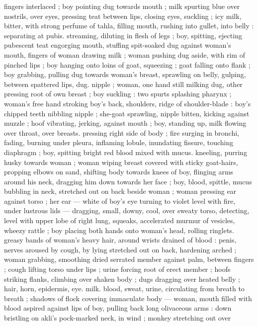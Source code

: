 fingers interlaced ; boy pointing dug towards mouth ; milk spurting 
blue over nostrils, over eyes, pressing teat between lips, closing 
eyes, suckling ; icy milk, bitter, with strong perfume of tahla, filling 
mouth, rushing into gullet, into belly : separating at pubis. 
streaming, diluting in flesh of legs ; boy, spitting, ejecting pubescent 
teat engorging mouth, stuffing spit-soaked dug against woman's 
mouth, fingers of woman drawing milk ; woman pushing dug aside, 
with rim of pinched lips ; boy hanging onto loins of goat, squeezing 
; goat falling onto flank ; boy grabbing, pulling dug towards woman's 
breast, sprawling on belly, gulping, between spattered lips, dug. 
nipple ; woman, one hand still milking dug, other pressing root of 
own breast ; boy suckling : two spurts splashing pharynx ; woman's 
free hand stroking boy's back, shoulders, ridge of shoulder-blade : 
boy's chipped teeth nibbling nipple ; she-goat sprawling, nipple 
bitten, kicking against muzzle ; hoof vibrating, jerking, against 
mouth ; boy, standing up, milk flowing over throat, over breasts. 
pressing right side of body ; fire surging in bronchi, fading, burning 
under pleura, inflaming lobule, inundating fissure, touching 
diaphragm ; boy, spitting bright red blood mixed with mucus. 
kneeling, purring husky towards woman ; woman wiping breast 
covered with sticky goat-hairs, propping elbows on sand, shifting 
body towards knees of boy, flinging arms around his neck, dragging 
him down towards her face ; boy, blood, spittle, mucus bubbling in 
neck, stretched out on back beside woman ; woman pressing ear 
against torso ; her ear --- white of boy's eye turning to violet level 
with fire, under lustrous lids --- dragging, small, downy, cool, over 
sweaty torso, detecting, level with upper lobe of right lung, squeaks, 
accelerated murmur of vesicles, wheezy rattle ; boy placing both 
hands onto woman's head, rolling ringlets. greasy bands of woman's 
heavy hair, around wrists drained of blood : penis, nerves aroused by 
cough, by lying stretched out on back, hardening arched ; woman 
grabbing, smoothing dried serrated member against palm, between 
fingers ; cough lifting torso under lips ; urine forcing root of erect 
member ; hoofs striking flanks, climbing over shaken body ; dugs 
dragging over heated belly ; hair, horn, epidermis, eye. milk. blood, 
sweat, urine, circulating from breath to breath ; shadows of flock 
covering immaculate body --- woman, mouth filled with blood aspired 
against lips of boy, pulling back long olivaceous arms : down bristling 
on akli's pock-marked neck, in wind ; monkey stretching out over 
